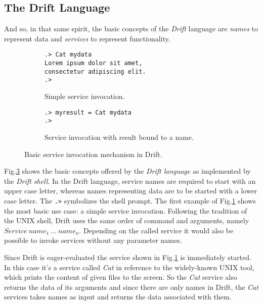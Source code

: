 \subsection{The Drift Language}
\label{driftlang}

And so, in that same spirit, the basic concepts of the \textit{Drift}
language are \textit{names} to represent data and \textit{services}
to represent functionality.

\begin{figure}[h]
    \centering
    \begin{subfigure}[b]{0.4\textwidth}

  \begin{lstlisting}
.> Cat mydata
Lorem ipsum dolor sit amet,
consectetur adipiscing elit.
.>
  \end{lstlisting}

        \caption{Simple service invocation.}
        \label{cat1}
    \end{subfigure}
    \hspace{20pt} %
    \begin{subfigure}[b]{0.4\textwidth}

  \begin{lstlisting}
.> myresult = Cat mydata
.>
  \end{lstlisting}

        \caption{Service invocation with result bound to a name.}
        \label{cat2}
    \end{subfigure}
    \caption{Basic service invocation mechanism in Drift.}\label{drift-examples1}
\end{figure}

Fig.\ref{drift-examples1} shows the basic concepts offered by
the \textit{Drift language} as implemented by the \textit{Drift shell}.
In the Drift language, service names are required to
start with an upper case letter, whereas names representing
data are to be started with a lower case letter. The \texttt{.>} symbolizes
the shell prompt. The first example of Fig.\ref{cat1}
shows the most basic use case: a simple service invocation.
Following the tradition of the UNIX shell, Drift uses the same
order of command and arguments, namely
$Service\ name_{1}\ ...\ name_{n}$.
Depending on the called service it would also be possible to
invoke services without any parameter names.

Since Drift is eager-evaluated the service shown in
Fig.\ref{cat1} is immediately started. In this case it's
a service called \textit{Cat} in reference to the widely-known
UNIX tool, which prints the content of given files to the screen.
So the \textit{Cat} service also returns the data of its arguments and
since there are only names in Drift, the \textit{Cat} services takes names
as input and returns the data associated with them.


